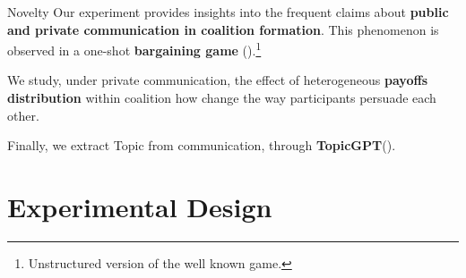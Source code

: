 \documentclass[aspectratio=169, xcolor=table]{beamer}
\begin{document}
\begin{frame}{Novelty}\justifying
    Our experiment provides insights into the frequent claims about \textbf{public and private communication in coalition formation}. This phenomenon is observed in a one-shot \textbf{bargaining game} (\citealt{TREMEWAN201633}).\footnote{Unstructured version of the well known \cite{baron1989bargaining} game.}
    
    \vspace{0.5\baselineskip}    
    We study, under private communication, the effect of heterogeneous \textbf{payoffs distribution} within  coalition how change the way participants persuade each other.
    
    \vspace{0.5\baselineskip}    
    Finally, we extract Topic from communication, through \textbf{TopicGPT}(\citealt{pham2024topicgpt, fieberg2025predicting}).
\end{frame}
\section{Experimental Design}
\end{document}
